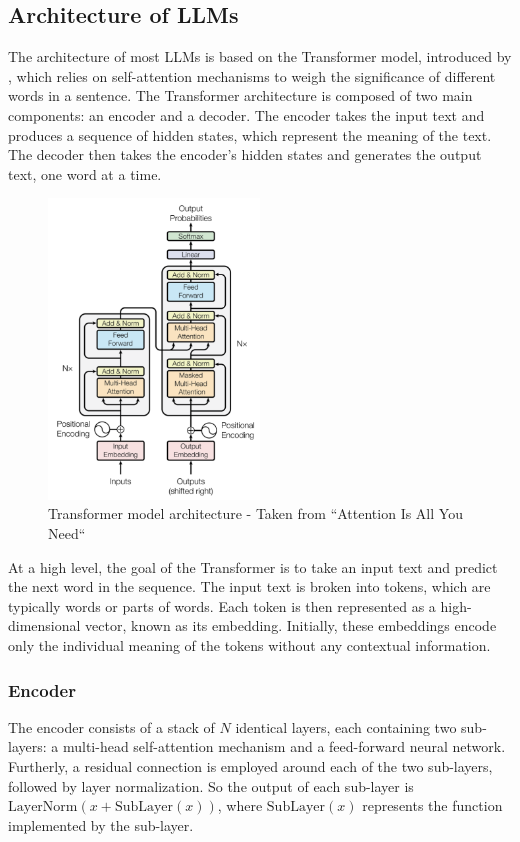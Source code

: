         \subsection{Architecture of LLMs}
        The architecture of most LLMs is based on the Transformer model, introduced by \cite{vaswani2023attention}, which relies on self-attention mechanisms to weigh the significance of different words in a sentence. The Transformer architecture is composed of two main components: an encoder and a decoder. The encoder takes the input text and produces a sequence of hidden states, which represent the meaning of the text. The decoder then takes the encoder's hidden states and generates the output text, one word at a time.
            \begin{figure}[h!]
                \centering
                \includegraphics[width=0.5\textwidth]{figs/transform_model.png}
                \caption{Transformer model architecture - Taken from “Attention Is All You Need“}
            \end{figure}

            At a high level, the goal of the Transformer is to take an input text and predict the next word in the sequence. The input text is broken into tokens, which are typically words or parts of words. Each token is then represented as a high-dimensional vector, known as its embedding. Initially, these embeddings encode only the individual meaning of the tokens without any contextual information.

            \subsubsection{Encoder}
            The encoder consists of a stack of \(N\) identical layers, each containing two sub-layers: a multi-head self-attention mechanism and a feed-forward neural network. Furtherly, a residual connection is employed around each of the two sub-layers, followed by layer normalization. So the output of each sub-layer is \(\text{LayerNorm}(x + \text{SubLayer} (x))\), where \(\text{SubLayer}(x)\) represents the function implemented by the sub-layer.
            
